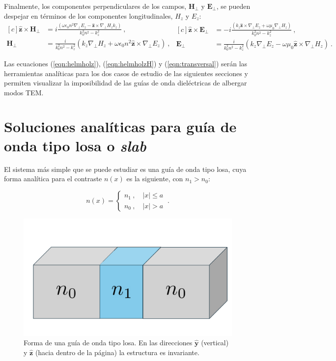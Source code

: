 Finalmente, los componentes perpendiculares de los campos, $\textbf{H}_\perp$ y $\textbf{E}_\perp$, se pueden despejar en términos de los componentes longitudinales, $H_z$ y $E_z$:
\begin{equation}
\begin{aligned}[c]
 \hat{\textbf{z}} \times \textbf{H}_\perp &= i\frac{(\omega\epsilon_0 n^2 \nabla_\perp E_z  - \hat{\textbf{z}} \times \nabla_\perp H_z k_z)}{k_0^2 n^2 - k_z^2} \ ,
 \\
\textbf{H}_\perp &= \frac{i}{k_0^2 n^2 - k_z^2}\left(k_z\nabla_\perp H_z + \omega \epsilon_0 n^2\hat{\textbf{z}} \times \nabla_\perp E_z\right) \ ,
\end{aligned}
\begin{aligned}[c]
	\hat{\textbf{z}} \times \textbf{E}_\perp &= -i\frac{(k_z\hat{\textbf{z}} \times \nabla_\perp E_z + \omega\mu_0 \nabla_\perp H_z)  }{k_0^2 n^2 - k_z^2} \ ,
	\\
\textbf{E}_\perp &= \frac{i}{k_0^2 n^2 - k_z^2}\left(k_z \nabla_\perp E_z - \omega\mu_0 \hat{\textbf{z}} \times \nabla_\perp H_z\right) \ . \label{eqn:transversal}
\end{aligned}
\end{equation}

Las ecuaciones (\ref{eqn:helmholz}), (\ref{eqn:helmholzH}) y (\ref{eqn:transversal}) serán las herramientas analíticas para los dos casos de estudio de las siguientes secciones y permiten visualizar la imposibilidad de las guías de onda dieléctricas de albergar modos TEM.
\section{Soluciones analíticas para guía de onda tipo losa o \textit{slab}}

El sistema más simple que se puede estudiar es una guía de onda tipo losa, cuya forma analítica para el contraste $n(x)$ es la siguiente, con $n_1 > n_0$:

\begin{equation*}
	n(x) = \left\{\begin{matrix}
	n_1 \ , \quad |x| \le a
	\\
	n_0 \ , \quad |x| > a
 	\end{matrix}\right. \ .
\end{equation*}

\begin{figure}[H]
	\centering
	\includegraphics[width=0.6\linewidth]{media/slab.pdf}
	\caption[Forma de una guía de onda tipo losa.]{Forma de una guía de onda tipo losa. En las direcciones $\mathbf{\hat{y}}$ (vertical) y $\mathbf{\hat{z}}$ (hacia dentro de la página) la estructura es invariante.}
\end{figure}


